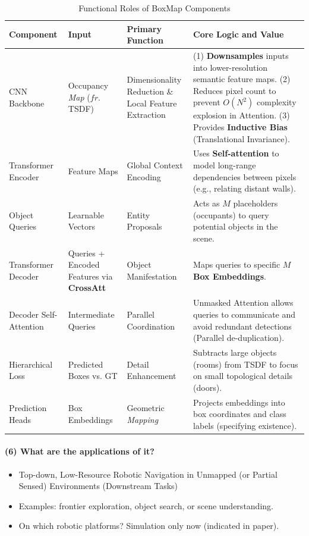 \documentclass{article}
\begin{document}
\begin{table}[h]
\centering
\caption{Functional Roles of BoxMap Components}
\label{tab:boxmap_components}
  \begin{tabularx}{\textwidth}{l l l X}
    \toprule
    Component & Input & Primary Function & Core Logic and Value \\ \midrule
    CNN Backbone & \makecell[l]{Occupancy \textit{Map} \\ ($fr.$ TSDF)} & \makecell[l]{Dimensionality Reduction \& \\ Local Feature Extraction} & (1) \textbf{Downsamples} inputs into lower-resolution semantic feature maps. \newline (2) Reduces pixel count to prevent $O(N^2)$ complexity explosion in Attention. \newline (3) Provides \textbf{Inductive Bias} (Translational Invariance). \\ \addlinespace
    Transformer Encoder & Feature Maps & Global Context Encoding & Uses \textbf{Self-attention} to model long-range dependencies between pixels (e.g., relating distant walls). \\ \addlinespace
    Object Queries & Learnable Vectors & Entity Proposals & Acts as $M$ placeholders (occupants) to query potential objects in the scene. \\ \addlinespace
    Transformer Decoder & \makecell[l]{Queries + \\ Encoded Features via \\ \textbf{CrossAtt}} & Object Manifestation & Maps queries to specific $M$ \textbf{Box Embeddings}. \\ \addlinespace
    Decoder Self-Attention & Intermediate Queries & Parallel Coordination & Unmasked Attention allows queries to communicate and avoid redundant detections (Parallel de-duplication). \\ \addlinespace
    Hierarchical Loss & Predicted Boxes vs. GT & Detail Enhancement & Subtracts large objects (rooms) from TSDF to focus on small topological details (doors). \\ \addlinespace
    Prediction Heads & Box Embeddings & Geometric \textit{Mapping} & Projects embeddings into box coordinates and class labels (specifying existence). \\ \bottomrule
  \end{tabularx}
\end{table}


\paragraph{(6) What are the applications of it?} 
\begin{itemize}
  \item Top-down, Low-Resource Robotic Navigation in Unmapped (or Partial Sensed) Environments (Downstream Tasks)
  \item Examples: frontier exploration, object search, or scene understanding.
  \item On which robotic platforms? Simulation only now (indicated in paper).
\end{itemize}
\end{document}

